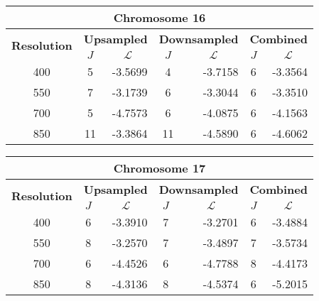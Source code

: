 \begin{table}[h!]
  \centering
\begin{tabular}{|c|c|r|c|r|c|r|}\hline
\multicolumn{7}{|c|}{\textbf{Chromosome 16}} \\ \hline
\multirow{2}{*}{\textbf{Resolution}} & \multicolumn{2}{|c|}{\textbf{Upsampled}} &  \multicolumn{2}{|c|}{\textbf{Downsampled}} &  \multicolumn{2}{|c|}{\textbf{Combined}} \\ \cline{2-7}
    & $J$ & \multicolumn{1}{|c|}{\textbf{$\mathcal{L}$}} & $J$ & \multicolumn{1}{|c|}{\textbf{$\mathcal{L}$}} &$J$ & \multicolumn{1}{|c|}{\textbf{$\mathcal{L}$}}   \\ \hline
400 & 5 & -3.5699 & 4 & -3.7158   & 6 & -3.3564  \\ \hline
550 & 7 & -3.1739 & 6 & -3.3044   & 6 & -3.3510  \\ \hline
700 & 5 & -4.7573 & 6 & -4.0875   & 6 & -4.1563  \\ \hline
850 & 11 & -3.3864 & 11 & -4.5890 & 6 & -4.6062  \\ \hline
\end{tabular}
\end{table}

\begin{table}[h!]
  \centering
\begin{tabular}{|c|c|r|c|r|c|r|}\hline
\multicolumn{7}{|c|}{\textbf{Chromosome 17}} \\ \hline
\multirow{2}{*}{\textbf{Resolution}} & \multicolumn{2}{|c|}{\textbf{Upsampled}} &  \multicolumn{2}{|c|}{\textbf{Downsampled}} &  \multicolumn{2}{|c|}{\textbf{Combined}} \\ \cline{2-7}
    & $J$ & \multicolumn{1}{|c|}{\textbf{$\mathcal{L}$}} & $J$ & \multicolumn{1}{|c|}{\textbf{$\mathcal{L}$}} &$J$ & \multicolumn{1}{|c|}{\textbf{$\mathcal{L}$}}   \\ \hline
400 & 6 & -3.3910 & 7 & -3.2701 & 6 & -3.4884  \\ \hline
550 & 8 & -3.2570 & 7 & -3.4897 & 7 & -3.5734  \\ \hline
700 & 6 & -4.4526 & 6 & -4.7788 & 8 & -4.4173  \\ \hline
850 & 8 & -4.3136 & 8 & -4.5374 & 6 & -5.2015  \\ \hline
\end{tabular}
\end{table}

\clearpage

